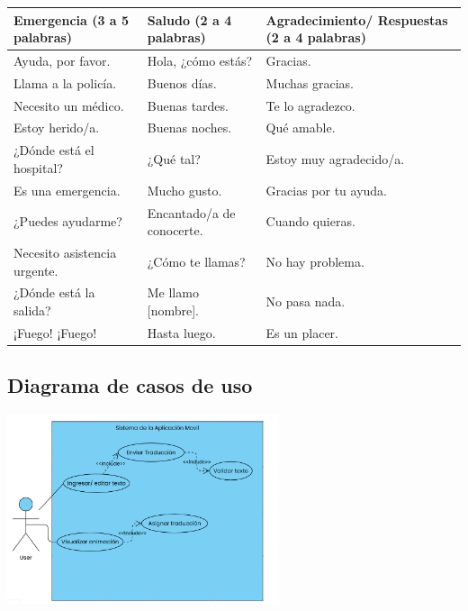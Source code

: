 


\noindent
\begin{tabularx}{\textwidth}{|X|X|X|}
\hline
\textbf{Emergencia (3 a 5 palabras)} & \textbf{Saludo (2 a 4 palabras)} & \textbf{Agradecimiento/ Respuestas (2 a 4 palabras)} \\ \hline
Ayuda, por favor. & Hola, ¿cómo estás? & Gracias. \\ \hline
Llama a la policía. & Buenos días. & Muchas gracias. \\ \hline
Necesito un médico. & Buenas tardes. & Te lo agradezco. \\ \hline
Estoy herido/a. & Buenas noches. & Qué amable. \\ \hline
¿Dónde está el hospital? & ¿Qué tal? & Estoy muy agradecido/a. \\ \hline
Es una emergencia. & Mucho gusto. & Gracias por tu ayuda. \\ \hline
¿Puedes ayudarme? & Encantado/a de conocerte. & Cuando quieras. \\ \hline
Necesito asistencia urgente. & ¿Cómo te llamas? & No hay problema. \\ \hline
¿Dónde está la salida? & Me llamo [nombre]. & No pasa nada. \\ \hline
¡Fuego! ¡Fuego! & Hasta luego. & Es un placer. \\ \hline
\end{tabularx}


\subsection{Diagrama de casos de uso}
\begin{center}
    \includegraphics[width=0.6\textwidth]{Images/Cap 3/casodeuso1.png}
\end{center}

